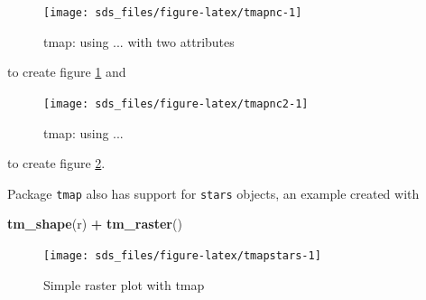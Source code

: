 \documentclass[]{book}
\newenvironment{Shaded}{\begin{snugshade}}{\end{snugshade}}
\newcommand{\DataTypeTok}[1]{\textcolor[rgb]{0.13,0.29,0.53}{#1}}
\newcommand{\FloatTok}[1]{\textcolor[rgb]{0.00,0.00,0.81}{#1}}
\newcommand{\KeywordTok}[1]{\textcolor[rgb]{0.13,0.29,0.53}{\textbf{#1}}}
\newcommand{\NormalTok}[1]{#1}
\newcommand{\OperatorTok}[1]{\textcolor[rgb]{0.81,0.36,0.00}{\textbf{#1}}}
\newcommand{\StringTok}[1]{\textcolor[rgb]{0.31,0.60,0.02}{#1}}
\begin{document}
\begin{figure}

{\centering \texttt{[image: sds\_files/figure-latex/tmapnc-1]} 

}

\caption{tmap: using ... with two attributes}\label{fig:tmapnc}
\end{figure}

to create figure \ref{fig:tmapnc} and

\begin{Shaded}
\end{Shaded}

\begin{figure}

{\centering \texttt{[image: sds\_files/figure-latex/tmapnc2-1]} 

}

\caption{tmap: using ...}\label{fig:tmapnc2}
\end{figure}

to create figure \ref{fig:tmapnc2}.

Package \texttt{tmap} also has support for \texttt{stars} objects, an example created with

\begin{Shaded}
\begin{Highlighting}[]
\KeywordTok{tm_shape}\NormalTok{(r) }\OperatorTok{+}\StringTok{ }\KeywordTok{tm_raster}\NormalTok{()}
\end{Highlighting}
\end{Shaded}

\begin{figure}

{\centering \texttt{[image: sds\_files/figure-latex/tmapstars-1]} 

}

\caption{Simple raster plot with tmap}\label{fig:tmapstars}
\end{figure}
\end{document}
